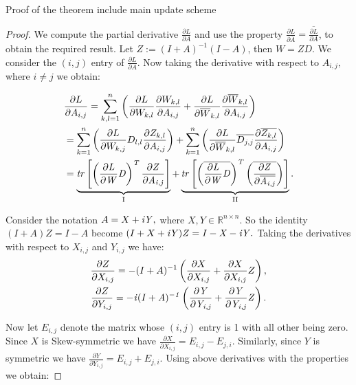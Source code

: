 \documentclass[letterpaper]{article} %
\begin{document}
Proof of the theorem include main update scheme
\begin{proof}
We compute the partial derivative $\frac{\partial L}{\partial A}$ and use the property $\frac{\partial L}{\partial \overline{A}}= \overline{\frac{\partial L}{\partial A}}$, to obtain the required result. Let $Z := (I+A)^{-1}(I-A)$, then $W = ZD$. We consider the $(i,j)$ entry of $\frac{\partial L}{\partial A}.$ Now taking the derivative with respect to $A_{i,j},$ where $i \neq j$ we obtain:

\begin{align*}
& \frac{\partial L}{\partial A_{i,j}} = \sum_{k,l = 1}^{n} \left(\frac{\partial L}{\partial W_{k, l}}
\frac{\partial W_{k, l}}{\partial A_{i,j}} 
+ \frac{\partial L}{\partial \overline{W}_{k,l}} \frac{\partial \overline{W}_{k, l}}{\partial A_{i,j}}\right) \\
 &= \sum_{k = 1}^{n} \left(\frac{\partial L}{\partial W_{k, j}}
D_{l,l}\frac{\partial Z_{k, l}}{\partial A_{i,j}}\right) 
+ \sum_{k = 1}^{n} \left( \frac{\partial L}{\partial \overline{W}_{k,l}} \overline{D_{j,j}}\frac{\partial \overline{Z_{k, l}}}{\partial A_{i,j}}\right) \\
 &= \underbrace{\it{tr}\left[\left(\frac{\partial L}{\partial W} D\right)^T \frac{\partial Z}{\partial A_{i,j}}\right]}_{\text{I}}
+ \underbrace{\it{tr}\left[\left(\overline{\frac{\partial L}{\partial W} D}\right)^T \left(\overline{\frac{\partial Z}{\partial \overline{A_{i,j}}}}\right)\right]}_{\text{II}}. 
\end{align*}

\noindent Consider the notation $A = X +\it{i}Y,$ where $X,Y \in \mathbb{R}^{n \times n}.$ So the identity $(I+A)Z = I-A$ become $(I+X+\it{i}Y)Z = I-X-\it{i}Y.$ Taking the derivatives with respect to $X_{i,j}$ and $Y_{i,j}$ we have:
\begin{gather}
\frac{\partial Z}{\partial X_{i,j}} = -(I+A)^{-1}\left( \frac{\partial X}{\partial X_{i,j}} + \frac{\partial X}{\partial X_{i,j}} Z \right),\\
\frac{\partial Z}{\partial Y_{i,j}} = -\it{i}(I+A)^{-1}\left( \frac{\partial Y}{\partial Y_{i,j}} + \frac{\partial Y}{\partial Y_{i,j}} Z \right).
\end{gather}

\noindent Now let $E_{i,j}$ denote the matrix whose $(i,j)$ entry is 1 with all other being zero. Since $X$ is Skew-symmetric we have $\frac{\partial X}{\partial X_{i,j}} = E_{i,j}-E_{j,i}.$ Similarly, since $Y$ is symmetric we have $\frac{\partial Y}{\partial Y_{i,j}} = E_{i,j}+E_{j,i}.$ Using above derivatives with the properties we obtain:


\end{proof}
\end{document}
